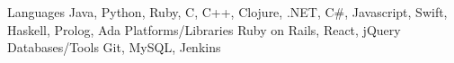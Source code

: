 \begin{cvskills}
  \cvskill
    {Languages}
    {Java, Python, Ruby, C, C++, Clojure, .NET, C\#, Javascript, Swift, Haskell, Prolog, Ada}
   \cvskill
    {Platforms/Libraries}
    {Ruby on Rails, React, jQuery}
   \cvskill
    {Databases/Tools}
    {Git, MySQL, Jenkins}
\end{cvskills}
